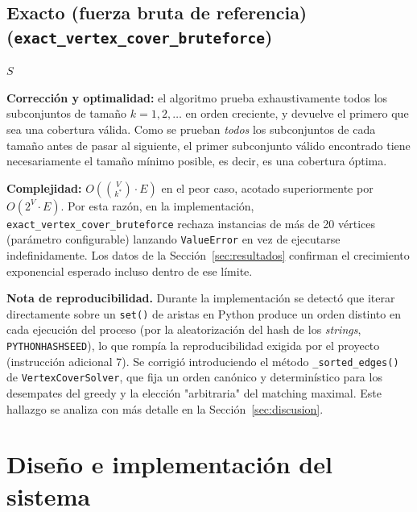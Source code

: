 \documentclass[11pt,a4paper]{article}
\begin{document}
\subsection{Exacto (fuerza bruta de referencia) (\texttt{exact\_vertex\_cover\_bruteforce})}

\begin{algorithm}[H]
\caption{\texttt{exact\_vertex\_cover\_bruteforce}}
\begin{algorithmic}[1]
			\State \Return $S$
		\EndIf
	\EndFor
\EndFor
\end{algorithmic}
\end{algorithm}

\textbf{Corrección y optimalidad:} el algoritmo prueba exhaustivamente todos los
subconjuntos de tamaño $k=1,2,\dots$ en orden creciente, y devuelve el primero que sea una
cobertura válida. Como se prueban \emph{todos} los subconjuntos de cada tamaño antes de
pasar al siguiente, el primer subconjunto válido encontrado tiene necesariamente el tamaño
mínimo posible, es decir, es una cobertura óptima.

\textbf{Complejidad:} $O\left(\binom{V}{k^{*}} \cdot E\right)$ en el peor caso, acotado
superiormente por $O(2^{V} \cdot E)$. Por esta razón, en la implementación,
\texttt{exact\_vertex\_cover\_bruteforce} rechaza instancias de más de 20 vértices
(parámetro configurable) lanzando \texttt{ValueError} en vez de ejecutarse
indefinidamente. Los datos de la Sección~\ref{sec:resultados} confirman el crecimiento
exponencial esperado incluso dentro de ese límite.

\textbf{Nota de reproducibilidad.} Durante la implementación se detectó que iterar
directamente sobre un \texttt{set()} de aristas en Python produce un orden distinto en cada
ejecución del proceso (por la aleatorización del hash de los \textit{strings},
\texttt{PYTHONHASHSEED}), lo que rompía la reproducibilidad exigida por el proyecto
(instrucción adicional 7). Se corrigió introduciendo el método
\texttt{\_sorted\_edges()} de \texttt{VertexCoverSolver}, que fija un orden canónico y
determinístico para los desempates del greedy y la elección "arbitraria" del matching
maximal. Este hallazgo se analiza con más detalle en la Sección~\ref{sec:discusion}.

\section{Diseño e implementación del sistema}
\label{sec:diseno-sistema}
\end{document}
